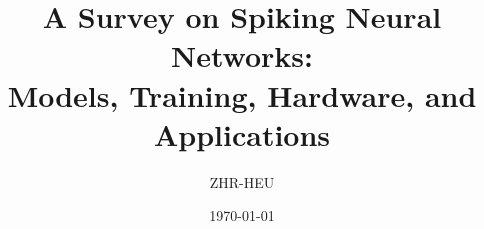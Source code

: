 \documentclass[11pt,a4paper]{article}
\title{\bfseries A Survey on Spiking Neural Networks:\\
Models, Training, Hardware, and Applications}
\author[1]{ZHR-HEU}
\affil[1]{\small Affiliation, Department, University}
\date{\today}
\begin{document}
\maketitle

\begin{abstract}

\end{abstract}












\end{document}
